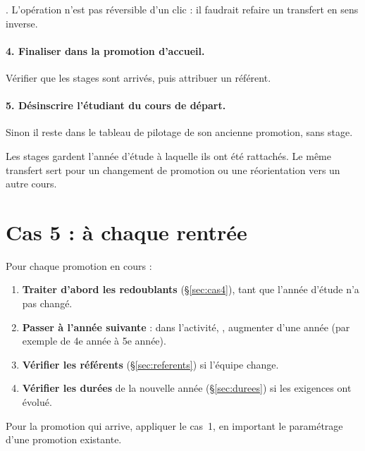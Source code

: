 \documentclass[11pt,a4paper]{article}
\begin{document}
. L'opération n'est pas réversible d'un clic : il
faudrait refaire un transfert en sens inverse.


\paragraph{4. Finaliser dans la promotion d'accueil.} Vérifier que les stages
sont arrivés, puis attribuer un référent.


\paragraph{5. Désinscrire l'étudiant du cours de départ.} Sinon il reste dans le
tableau de pilotage de son ancienne promotion, sans stage.

Les stages gardent l'année d'étude à laquelle ils ont été rattachés. Le même
transfert sert pour un changement de promotion ou une réorientation vers un autre
cours.

\section{Cas 5 : à chaque rentrée}
\label{sec:cas5}

Pour chaque promotion en cours :
\begin{enumerate}
  \item \textbf{Traiter d'abord les redoublants} (§\ref{sec:cas4}), tant que
        l'année d'étude n'a pas changé.
  \item \textbf{Passer à l'année suivante} : dans l'activité,
        , augmenter
        d'une année (par exemple de \og 4e année\fg{} à \og 5e année\fg{}).
  \item \textbf{Vérifier les référents} (§\ref{sec:referents}) si l'équipe
        change.
  \item \textbf{Vérifier les durées} de la nouvelle année
        (§\ref{sec:durees}) si les exigences ont évolué.
\end{enumerate}
Pour la promotion qui arrive, appliquer le cas~1, en important le paramétrage
d'une promotion existante.
\end{document}
